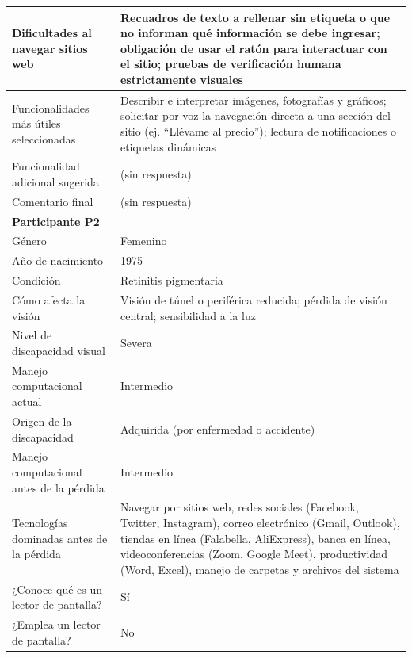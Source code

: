 \begin{longtable}{|p{4cm}|p{10.5cm}|}
    \hline
    Dificultades al navegar sitios web & Recuadros de texto a rellenar sin etiqueta o que no informan qué información se debe ingresar; obligación de usar el ratón para interactuar con el sitio; pruebas de verificación humana estrictamente visuales \\
    \hline
    Funcionalidades más útiles seleccionadas & Describir e interpretar imágenes, fotografías y gráficos; solicitar por voz la navegación directa a una sección del sitio (ej. ``Llévame al precio''); lectura de notificaciones o etiquetas dinámicas \\
    \hline
    Funcionalidad adicional sugerida & (sin respuesta) \\
    \hline
    Comentario final & (sin respuesta) \\
    \hline

    \multicolumn{2}{|l|}{\textbf{Participante P2}} \\
    \hline
    Género & Femenino \\
    \hline
    Año de nacimiento & 1975 \\
    \hline
    Condición & Retinitis pigmentaria \\
    \hline
    Cómo afecta la visión & Visión de túnel o periférica reducida; pérdida de visión central; sensibilidad a la luz \\
    \hline
    Nivel de discapacidad visual & Severa \\
    \hline
    Manejo computacional actual & Intermedio \\
    \hline
    Origen de la discapacidad & Adquirida (por enfermedad o accidente) \\
    \hline
    Manejo computacional antes de la pérdida & Intermedio \\
    \hline
    Tecnologías dominadas antes de la pérdida & Navegar por sitios web, redes sociales (Facebook, Twitter, Instagram), correo electrónico (Gmail, Outlook), tiendas en línea (Falabella, AliExpress), banca en línea, videoconferencias (Zoom, Google Meet), productividad (Word, Excel), manejo de carpetas y archivos del sistema \\
    \hline
    ¿Conoce qué es un lector de pantalla? & Sí \\
    \hline
    ¿Emplea un lector de pantalla? & No \\
    \hline


\end{longtable}
